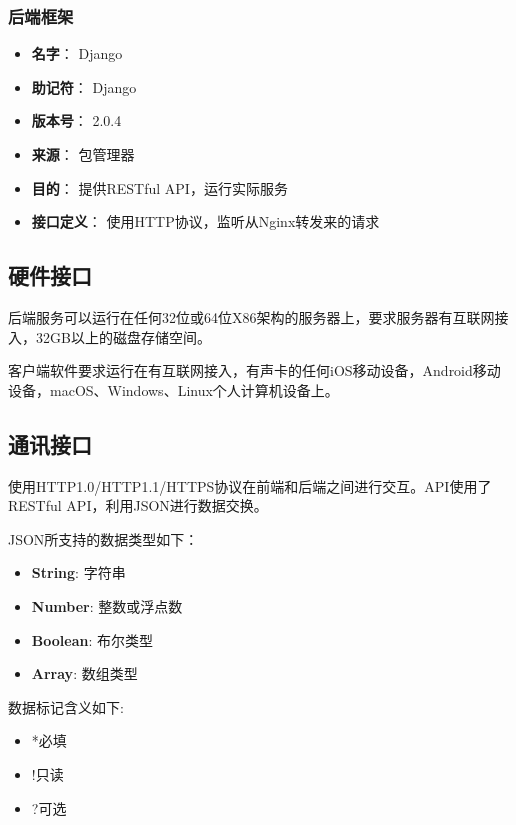 \subsubsection{后端框架} %
\begin{itemize}
	\item \textbf{名字}：
	Django
	\item \textbf{助记符}：
	Django
	\item \textbf{版本号}：
	2.0.4
	\item \textbf{来源}：
	包管理器
	\item \textbf{目的}：
	提供RESTful API，运行实际服务
	\item \textbf{接口定义}：
	使用HTTP协议，监听从Nginx转发来的请求
\end{itemize}

\subsection{硬件接口}

后端服务可以运行在任何32位或64位X86架构的服务器上，要求服务器有互联网接入，32GB以上的磁盘存储空间。

客户端软件要求运行在有互联网接入，有声卡的任何iOS移动设备，Android移动设备，macOS、Windows、Linux个人计算机设备上。


\subsection{通讯接口}

使用HTTP1.0/HTTP1.1/HTTPS协议在前端和后端之间进行交互。API使用了RESTful API，利用JSON进行数据交换。

JSON所支持的数据类型如下：
\begin{itemize}
	\item \textbf{String}: 字符串
	\item \textbf{Number}: 整数或浮点数
	\item \textbf{Boolean}: 布尔类型
	\item \textbf{Array}: 数组类型
\end{itemize}

数据标记含义如下:
\begin{itemize}
	\item *必填
	\item !只读
	\item ?可选
\end{itemize}

